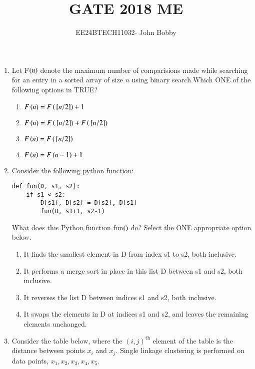 \documentclass[journal,12pt,onecolumn]{IEEEtran}
\theoremstyle{remark}
\begin{document}

\vspace{3cm}

\title{\textbf{GATE 2018 ME}}
\author{EE24BTECH11032- John Bobby}
\maketitle
\bigskip

\renewcommand{\thefigure}{\theenumi}
\renewcommand{\thetable}{\theenumi}
\setlength{\columnsep}{2.5em}
\begin{enumerate}
    \item Let F$\left(n\right)$ denote the maximum number of comparisions made while searching for an entry in a sorted array of size $n$ using binary search.Which ONE of the following options in TRUE?
    \begin{enumerate}
        \item $F\left(n\right)=F\left({}\left[n/2\right]\right)+1$
        \item $F\left(n\right)=F\left({}\left[n/2\right]\right)+F\left({}\left[n/2\right]\right)$
        \item $F\left(n\right)=F\left({}\left[n/2\right]\right)$
        \item ${F\left(n\right)=F\left(n-1\right)+1}$
    \end{enumerate}
    \item Consider the following python function:\\
    \begin{verbatim}
def fun(D, s1, s2):
    if s1 < s2:
        D[s1], D[s2] = D[s2], D[s1]
        fun(D, s1+1, s2-1)
\end{verbatim}
What does this Python function fun$\left(\right)$ do? Select the ONE appropriate option below.\\
\begin{enumerate}
    \item It finds the smallest element in D from index s1 to s2, both inclusive.
    \item It performs a merge sort in place in this list D between  s1 and s2, both inclusive.
    \item It reverses the list D between indices s1 and s2, both inclusive.
    \item It swaps the elements in D at indices s1 and s2, and leaves the remaining elements unchanged.
\end{enumerate}


\item Consider the table below, where the $(i, j)^{\text{th}}$ element of the table is the distance between points $x_i$ and $x_j$. Single linkage clustering is performed on data points, $x_1, x_2, x_3, x_4, x_5$.


\end{enumerate}
\end{document}
